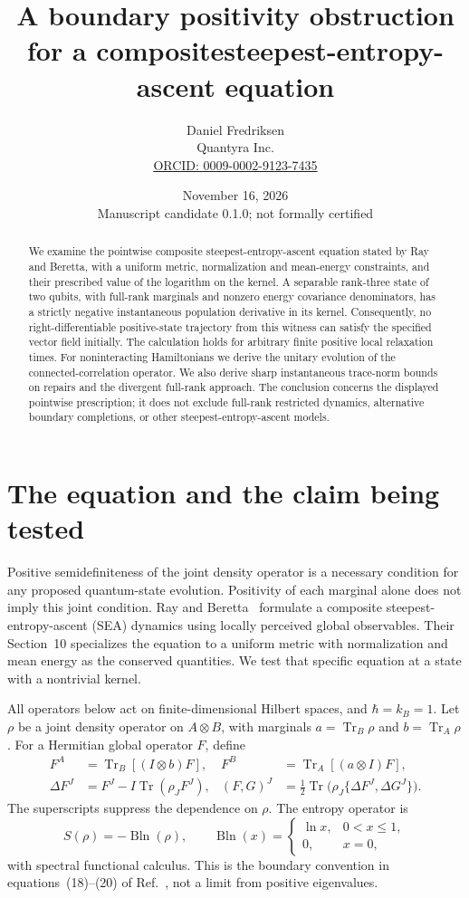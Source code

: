\documentclass[11pt]{article}
\title{A boundary positivity obstruction for a composite\newline steepest-entropy-ascent equation}
\author{Daniel Fredriksen\\Quantyra Inc.\\
\small\href{https://orcid.org/0009-0002-9123-7435}{ORCID: 0009-0002-9123-7435}}
\date{November 16, 2026\\\small Manuscript candidate 0.1.0; not formally certified}
\newcommand{\tr}{\operatorname{Tr}}
\newcommand{\bln}{\operatorname{Bln}}
\newcommand{\ac}[2]{\{#1,#2\}}
\begin{document}
\maketitle
\begin{abstract}
We examine the pointwise composite steepest-entropy-ascent equation stated by Ray and Beretta, with a uniform metric, normalization and mean-energy constraints, and their prescribed value of the logarithm on the kernel. A separable rank-three state of two qubits, with full-rank marginals and nonzero energy covariance denominators, has a strictly negative instantaneous population derivative in its kernel. Consequently, no right-differentiable positive-state trajectory from this witness can satisfy the specified vector field initially. The calculation holds for arbitrary finite positive local relaxation times. For noninteracting Hamiltonians we derive the unitary evolution of the connected-correlation operator. We also derive sharp instantaneous trace-norm bounds on repairs and the divergent full-rank approach. The conclusion concerns the displayed pointwise prescription; it does not exclude full-rank restricted dynamics, alternative boundary completions, or other steepest-entropy-ascent models.
\end{abstract}

\section{The equation and the claim being tested}
Positive semidefiniteness of the joint density operator is a necessary condition for any proposed quantum-state evolution. Positivity of each marginal alone does not imply this joint condition. Ray and Beretta~\cite{RayBeretta} formulate a composite steepest-entropy-ascent (SEA) dynamics using locally perceived global observables. Their Section~10 specializes the equation to a uniform metric with normalization and mean energy as the conserved quantities. We test that specific equation at a state with a nontrivial kernel.

All operators below act on finite-dimensional Hilbert spaces, and $\hbar=k_B=1$. Let $\rho$ be a joint density operator on $A\otimes B$, with marginals $a=\tr_B\rho$ and $b=\tr_A\rho$. For a Hermitian global operator $F$, define
\begin{align}
 F^A&=\tr_B[(I\otimes b)F], &F^B&=\tr_A[(a\otimes I)F],\label{eq:perception}\\
 \Delta F^J&=F^J-I\tr(\rho_JF^J), &
 (F,G)^J&=\tfrac12\tr\bigl(\rho_J\ac{\Delta F^J}{\Delta G^J}\bigr).
\end{align}
The superscripts suppress the dependence on $\rho$. The entropy operator is
\begin{equation}
 S(\rho)=-\bln(\rho),\qquad
 \bln(x)=\begin{cases}\ln x,&0<x\leq1,\\0,&x=0,\end{cases}\label{eq:blog}
\end{equation}
with spectral functional calculus. This is the boundary convention in equations~(18)--(20) of Ref.~\cite{RayBeretta}, not a limit from positive eigenvalues.
\end{document}
